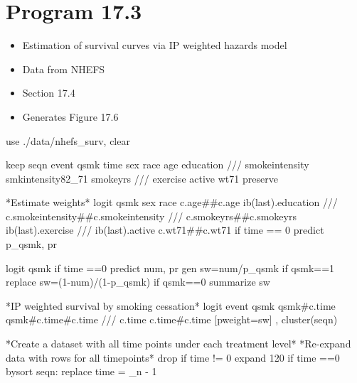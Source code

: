 \documentclass[
  10pt,
  a4paper,
]{book}
\newenvironment{Shaded}{\begin{snugshade}}{\end{snugshade}}
\newcommand{\BaseNTok}[1]{\textcolor[rgb]{0.68,0.00,0.00}{#1}}
\newcommand{\CommentTok}[1]{\textcolor[rgb]{0.37,0.37,0.37}{#1}}
\newcommand{\DataTypeTok}[1]{\textcolor[rgb]{0.68,0.00,0.00}{#1}}
\newcommand{\DecValTok}[1]{\textcolor[rgb]{0.68,0.00,0.00}{#1}}
\newcommand{\FunctionTok}[1]{\textcolor[rgb]{0.28,0.35,0.67}{#1}}
\newcommand{\KeywordTok}[1]{\textcolor[rgb]{0.00,0.46,0.62}{#1}}
\newcommand{\NormalTok}[1]{\textcolor[rgb]{0.00,0.46,0.62}{#1}}
\newcommand{\OtherTok}[1]{\textcolor[rgb]{0.00,0.46,0.62}{#1}}
\providecommand{\tightlist}{%
  \setlength{\itemsep}{0pt}\setlength{\parskip}{0pt}}
\begin{document}
\hypertarget{program-17.3-1}{%
\section{Program 17.3}\label{program-17.3-1}}

\begin{itemize}
\tightlist
\item
  Estimation of survival curves via IP weighted hazards model
\item
  Data from NHEFS
\item
  Section 17.4
\item
  Generates Figure 17.6
\end{itemize}

\begin{Shaded}
\begin{Highlighting}[]
\KeywordTok{use}\NormalTok{ ./}\KeywordTok{data}\NormalTok{/nhefs\_surv, }\KeywordTok{clear}

\KeywordTok{keep}\NormalTok{ seqn event qsmk time sex race age education }\CommentTok{///}
\NormalTok{  smokeintensity smkintensity82\_71 smokeyrs }\CommentTok{///}
\NormalTok{  exercise active wt71}
\KeywordTok{preserve} 

\NormalTok{*Estimate weights*}
\KeywordTok{logit}\NormalTok{ qsmk sex race c.age\#\#c.age ib(}\FunctionTok{last}\NormalTok{).education }\CommentTok{///}
\NormalTok{  c.smokeintensity\#\#c.smokeintensity }\CommentTok{///}
\NormalTok{  c.smokeyrs\#\#c.smokeyrs ib(}\FunctionTok{last}\NormalTok{).exercise }\CommentTok{///}
\NormalTok{  ib(}\FunctionTok{last}\NormalTok{).active c.wt71\#\#c.wt71 }\KeywordTok{if}\NormalTok{ time == 0}
\KeywordTok{predict}\NormalTok{ p\_qsmk, pr}

\KeywordTok{logit}\NormalTok{ qsmk }\KeywordTok{if}\NormalTok{ time ==0 }
\KeywordTok{predict}\NormalTok{ num, pr}
\KeywordTok{gen} \KeywordTok{sw}\NormalTok{=num/p\_qsmk }\KeywordTok{if}\NormalTok{ qsmk==1}
\KeywordTok{replace} \KeywordTok{sw}\NormalTok{=(1{-}num)/(1{-}p\_qsmk) }\KeywordTok{if}\NormalTok{ qsmk==0}
\KeywordTok{summarize} \KeywordTok{sw}

\NormalTok{*IP weighted survival }\KeywordTok{by}\NormalTok{ smoking cessation*}
\KeywordTok{logit}\NormalTok{ event qsmk qsmk\#c.time qsmk\#c.time\#c.time }\CommentTok{///}
\NormalTok{  c.time c.time\#c.time [}\KeywordTok{pweight}\NormalTok{=}\KeywordTok{sw}\NormalTok{] , }\KeywordTok{cluster}\NormalTok{(seqn) }

\NormalTok{*Create a dataset with }\OtherTok{all}\NormalTok{ time points under each treatment }\DecValTok{level}\NormalTok{*}
\NormalTok{*Re{-}expand }\KeywordTok{data}\NormalTok{ with }\BaseNTok{rows} \KeywordTok{for} \OtherTok{all}\NormalTok{ timepoints*}
\KeywordTok{drop} \KeywordTok{if}\NormalTok{ time != 0}
\NormalTok{expand 120 }\KeywordTok{if}\NormalTok{ time ==0 }
\KeywordTok{bysort}\NormalTok{ seqn: }\KeywordTok{replace}\NormalTok{ time = }\DataTypeTok{\_n}\NormalTok{ {-} 1       }
        

\end{Highlighting}
\end{Shaded}
\end{document}
